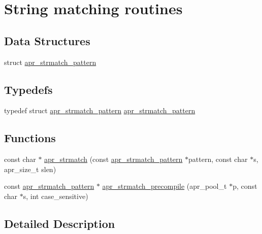 \hypertarget{group___a_p_r___util___str_match}{\section{String matching routines}
\label{group___a_p_r___util___str_match}
}
\subsection*{Data Structures}
\begin{DoxyCompactItemize}
\item 
struct \hyperlink{structapr__strmatch__pattern}{apr\-\_\-strmatch\-\_\-pattern}
\end{DoxyCompactItemize}
\subsection*{Typedefs}
\begin{DoxyCompactItemize}
\item 
typedef struct \hyperlink{structapr__strmatch__pattern}{apr\-\_\-strmatch\-\_\-pattern} \hyperlink{group___a_p_r___util___str_match_gab7fc6f6d1b15c8d8750b4637b8ac5679}{apr\-\_\-strmatch\-\_\-pattern}
\end{DoxyCompactItemize}
\subsection*{Functions}
\begin{DoxyCompactItemize}
\item 
const char $\ast$ \hyperlink{group___a_p_r___util___str_match_gada0fdf0c9dcb92083159bb4f8bfb9158}{apr\-\_\-strmatch} (const \hyperlink{structapr__strmatch__pattern}{apr\-\_\-strmatch\-\_\-pattern} $\ast$pattern, const char $\ast$s, apr\-\_\-size\-\_\-t slen)
\item 
const \hyperlink{structapr__strmatch__pattern}{apr\-\_\-strmatch\-\_\-pattern} $\ast$ \hyperlink{group___a_p_r___util___str_match_gaf38b738b333c59a3f6439b71f1277dd9}{apr\-\_\-strmatch\-\_\-precompile} (apr\-\_\-pool\-\_\-t $\ast$p, const char $\ast$s, int case\-\_\-sensitive)
\end{DoxyCompactItemize}


\subsection{Detailed Description}


